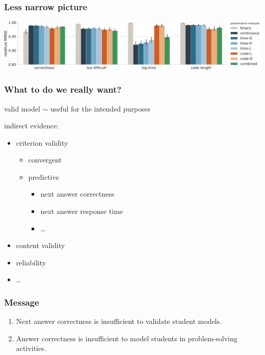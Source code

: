 \documentclass[bigger]{beamer}
\begin{document}
\begin{frame}
  \frametitle{Less narrow picture}
  \hspace*{-0.65cm}
  \includegraphics[width=1.1\linewidth]{figures/predictive-validity}
\end{frame}


\begin{frame}
  \frametitle{What to do we really want?}
  valid model $\sim$ useful for the intended purposes
  \pause

  \medskip
  indirect evidence:
  \vspace{-0.1cm}
  \begin{itemize}
    \item criterion validity
    \begin{itemize}
      \item convergent
      \item predictive
      \begin{itemize}
        \item \alert{next answer correctness}
        \item next answer response time
        \item \ldots
      \end{itemize}
    \end{itemize}
    \item content validity
    \item reliability
    \item \ldots
  \end{itemize}
\end{frame}


\begin{frame}
\frametitle{Message}
\begin{enumerate}
\item Next answer correctness is insufficient to validate student models.
\item Answer correctness is insufficient to model students in problem-solving activities.
\end{enumerate}
\end{frame}
\end{document}
